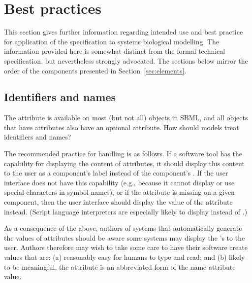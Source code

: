 
\section{Best practices}
\label{sec:best-practices}

This section gives further information regarding intended use and
best practice for application of the specification to systems
biological modelling. The information provided here is somewhat
distinct from the formal technical specification, but nevertheless
strongly advocated.  The sections below mirror the order of the
components presented in Section~\ref{sec:elements}.


\subsection{Identifiers and names}
\label{sec:bp:names}

The  attribute is available on most (but not all)
objects in SBML, and all objects that have  attributes
also have an optional  attribute.  How should models
treat identifiers and names?

The recommended practice for handling  is as follows.
If a software tool has the capability for displaying the content
of  attributes, it should display this content to the user
as a component's label instead of the component's .
If the user interface does not have this capability (e.g.,
because it cannot display or use special characters in symbol
names), or if the  attribute is missing on a given
component, then the user interface should display the value of the
 attribute instead.  (Script language interpreters are
especially likely to display  instead of
.)

As a consequence of the above, authors of systems that
automatically generate the values of  attributes should be
aware some systems may display the 's to the user.
Authors therefore may wish to take some care to have their
software create  values that are: (a) reasonably easy
for humans to type and read; and (b) likely to be meaningful, \eg
the  attribute is an abbreviated form of the name attribute value.

